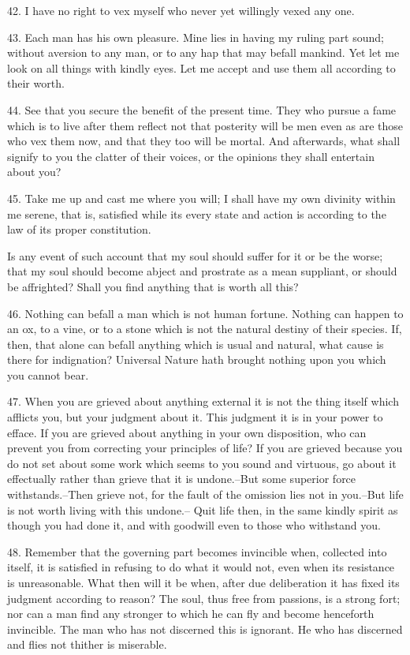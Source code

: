 \documentclass{book}
\begin{document}
42. I have no right to vex myself who never yet willingly vexed any
one.

43. Each man has his own pleasure. Mine lies in having my ruling part
sound; without aversion to any man, or to any hap that may befall
mankind. Yet let me look on all things with kindly eyes. Let me accept
and use them all according to their worth.

44. See that you secure the benefit of the present time. They who
pursue a fame which is to live after them reflect not that posterity
will be men even as are those who vex them now, and that they too will
be mortal. And afterwards, what shall signify to you the clatter of
their voices, or the opinions they shall entertain about you?

45. Take me up and cast me where you will; I shall have my own
divinity within me serene, that is, satisfied while its every state
and action is according to the law of its proper constitution.

Is any event of such account that my soul should suffer for it or be
the worse; that my soul should become abject and prostrate as a mean
suppliant, or should be affrighted? Shall you find anything that is
worth all this?

46. Nothing can befall a man which is not human fortune. Nothing can
happen to an ox, to a vine, or to a stone which is not the natural
destiny of their species. If, then, that alone can befall anything
which is usual and natural, what cause is there for indignation?
Universal Nature hath brought nothing upon you which you cannot bear.

47. When you are grieved about anything external it is not the thing
itself which afflicts you, but your judgment about it. This judgment
it is in your power to efface. If you are grieved about anything in
your own disposition, who can prevent you from correcting your
principles of life? If you are grieved because you do not set about
some work which seems to you sound and virtuous, go about it
effectually rather than grieve that it is undone.--But some superior
force withstands.--Then grieve not, for the fault of the omission
lies not in you.--But life is not worth living with this undone.--
Quit life then, in the same kindly spirit as though you had done it,
and with goodwill even to those who withstand you.

48. Remember that the governing part becomes invincible when,
collected into itself, it is satisfied in refusing to do what it would
not, even when its resistance is unreasonable. What then will it be
when, after due deliberation it has fixed its judgment according to
reason? The soul, thus free from passions, is a strong fort; nor can a
man find any stronger to which he can fly and become henceforth
invincible. The man who has not discerned this is ignorant. He who has
discerned and flies not thither is miserable.
\end{document}
